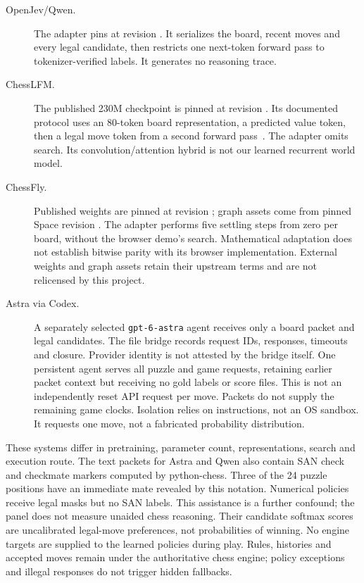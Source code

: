 \documentclass[10pt]{article}
\begin{document}
\begin{description}
\item[OpenJev/Qwen.] The adapter pins
 at revision
. It serializes the board,
recent moves and every legal candidate, then restricts one next-token forward
pass to tokenizer-verified labels. It generates no reasoning trace.
\item[ChessLFM.] The published 230M checkpoint is pinned at revision
. Its documented protocol uses
an 80-token board representation, a predicted value token, then a legal move
token from a second forward pass~\cite{chesslfm}. The adapter omits search.
Its convolution/attention hybrid is not our learned recurrent world model.
\item[ChessFly.] Published weights are pinned at revision
; graph assets come from pinned
Space revision .
The adapter performs five settling steps from zero per board, without the
browser demo's search. Mathematical adaptation does not establish bitwise
parity with its browser implementation. External weights and graph assets
retain their upstream terms and are not relicensed by this project.
\item[Astra via Codex.] A separately selected \texttt{gpt-6-astra} agent receives
only a board packet and legal candidates. The file bridge records request IDs,
responses, timeouts and closure. Provider identity is not attested by the bridge
itself. One persistent agent serves all puzzle and game requests, retaining
earlier packet context but receiving no gold labels or score files. This is not
an independently reset API request per move. Packets do not supply the remaining
game clocks. Isolation relies on instructions,
not an OS sandbox. It requests one move, not a fabricated probability distribution.
\end{description}

These systems differ in pretraining, parameter count, representations, search
and execution route. The text packets for Astra and Qwen also contain
SAN check and checkmate markers computed by python-chess. Three of the 24
puzzle positions have an immediate mate revealed by this notation. Numerical
policies receive legal masks but no SAN labels. This assistance is a further
confound; the panel does not measure unaided chess reasoning. Their candidate softmax scores are uncalibrated legal-move
preferences, not probabilities of winning. No engine targets are supplied to
the learned policies during play. Rules, histories and accepted moves remain
under the authoritative chess engine; policy exceptions and illegal responses
do not trigger hidden fallbacks.
\end{document}
